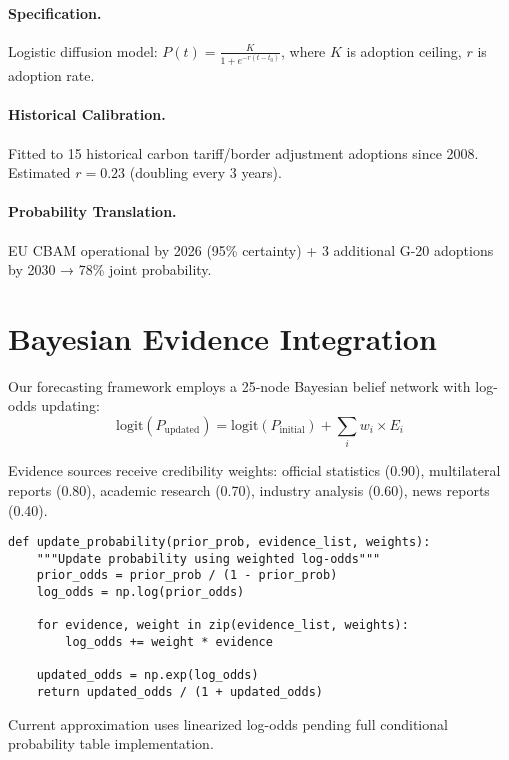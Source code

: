 \documentclass{article}
\begin{document}
\paragraph{Specification.} Logistic diffusion model: \( P(t) = \frac{K}{1 + e^{-r(t-t_0)}} \), where \( K \) is adoption ceiling, \( r \) is adoption rate.
\paragraph{Historical Calibration.} Fitted to 15 historical carbon tariff/border adjustment adoptions since 2008. Estimated \( r = 0.23 \) (doubling every 3 years).
\paragraph{Probability Translation.} EU CBAM operational by 2026 (95\% certainty) + 3 additional G-20 adoptions by 2030 → 78\% joint probability.

\section{Bayesian Evidence Integration}
Our forecasting framework employs a 25-node Bayesian belief network with log-odds updating: 
\[ \text{logit}(P_{\text{updated}}) = \text{logit}(P_{\text{initial}}) + \sum_{i} w_i \times E_i \]

Evidence sources receive credibility weights: official statistics (0.90), multilateral reports (0.80), academic research (0.70), industry analysis (0.60), news reports (0.40).

\begin{lstlisting}[caption={Evidence integration in \texttt{bayesian\_model.py}},label={lst:update}]
def update_probability(prior_prob, evidence_list, weights):
    """Update probability using weighted log-odds"""
    prior_odds = prior_prob / (1 - prior_prob)
    log_odds = np.log(prior_odds)
    
    for evidence, weight in zip(evidence_list, weights):
        log_odds += weight * evidence
    
    updated_odds = np.exp(log_odds)
    return updated_odds / (1 + updated_odds)
\end{lstlisting}

Current approximation uses linearized log-odds pending full conditional probability table implementation.

\end{document}

